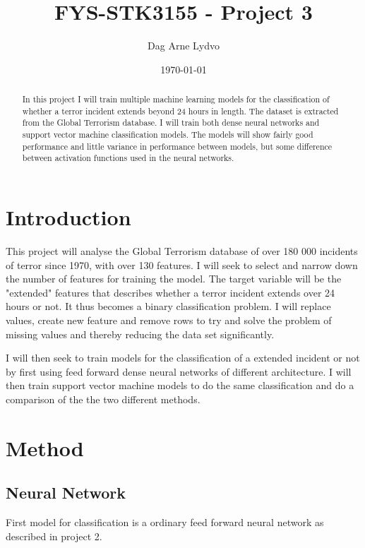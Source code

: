 \documentclass[reprint,english,notitlepage]{revtex4-2}  %
\begin{document}
\title{FYS-STK3155 - Project 3}   %
\author{Dag Arne Lydvo}               %
\date{\today}                             %
\noaffiliation                            %
\begin{abstract}                          %
 In this project I will train multiple machine learning models for the classification of whether a terror incident extends beyond 24 hours in length. The dataset is extracted from the Global Terrorism database. I will train both dense neural networks and support vector machine classification models. The models will show fairly good performance and little variance in performance between models, but some difference between activation functions used in the neural networks.  
\end{abstract}                            %
\maketitle                                %


\section{Introduction}
This project will analyse the Global Terrorism database of over 180 000 incidents of terror since 1970, with over 130 features. I will seek to select and narrow down the number of features for training the model. The target variable will be the "extended" features that describes whether a terror incident extends over 24 hours or not. It thus becomes a binary classification problem. I will replace values, create new feature and remove rows to try and solve the problem of missing values and thereby reducing the data set significantly. 

I will then seek to train models for the classification of a extended incident or not by first using feed forward dense neural networks of different architecture. I will then train support vector machine models to do the same classification and do a comparison of the the two different methods. 

\section{Method}
\subsection{Neural Network}
First model for classification is a ordinary feed forward neural network as described in project 2. 
\end{document}
